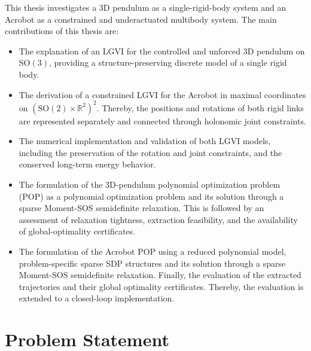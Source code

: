 This thesis investigates a 3D pendulum as a 
single-rigid-body system and an Acrobot as a constrained and underactuated multibody system. 
The main contributions of this thesis are:

\begin{itemize}
\item The explanation of an LGVI for the controlled and unforced 3D pendulum on $\mathrm{SO}(3)$, 
providing a structure-preserving discrete model of a single rigid body.

\item The derivation of a constrained LGVI for the Acrobot in maximal coordinates on 
$(\mathrm{SO}(2)\times \mathbb{R}^2)^2$.
Thereby, the positions and rotations of both rigid links are represented separately 
and connected through holonomic joint constraints.

\item The numerical implementation and validation of both LGVI models, including the 
preservation of the rotation and joint constraints, and the conserved long-term energy 
behavior.

\item The formulation of the 3D-pendulum polynomial optimization problem (POP) as a polynomial 
optimization problem and its solution through a sparse Moment-SOS semidefinite relaxation. 
This is followed by an assessment of relaxation tightness, extraction feasibility, and the availability 
of global-optimality certificates.

\item The formulation of the Acrobot POP using a reduced polynomial 
model, problem-specific sparse SDP structures and its solution through 
a sparse Moment-SOS semidefinite relaxation.
Finally, the evaluation of the extracted trajectories and their global optimality certificates.
Thereby, the evaluation is extended to a closed-loop implementation.
\end{itemize}

\section{Problem Statement}
\label{sec:introduction_problem_statement}


